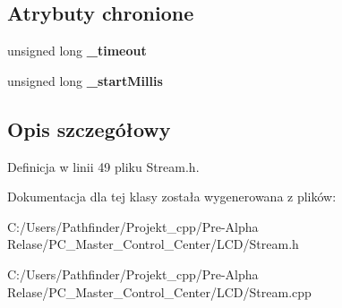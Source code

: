 \subsection*{Atrybuty chronione}
\begin{DoxyCompactItemize}
\item 
\mbox{\label{class_stream_aae48f1a926d2e82a452f2c75af0c6a29}} 
unsigned long {\bfseries \+\_\+timeout}
\item 
\mbox{\label{class_stream_abf61d2006d28d18f2e028285a323fe5a}} 
unsigned long {\bfseries \+\_\+start\+Millis}
\end{DoxyCompactItemize}


\subsection{Opis szczegółowy}


Definicja w linii 49 pliku Stream.\+h.



Dokumentacja dla tej klasy została wygenerowana z plików\+:\begin{DoxyCompactItemize}
\item 
C\+:/\+Users/\+Pathfinder/\+Projekt\+\_\+cpp/\+Pre-\/\+Alpha Relase/\+P\+C\+\_\+\+Master\+\_\+\+Control\+\_\+\+Center/\+L\+C\+D/Stream.\+h\item 
C\+:/\+Users/\+Pathfinder/\+Projekt\+\_\+cpp/\+Pre-\/\+Alpha Relase/\+P\+C\+\_\+\+Master\+\_\+\+Control\+\_\+\+Center/\+L\+C\+D/Stream.\+cpp\end{DoxyCompactItemize}
